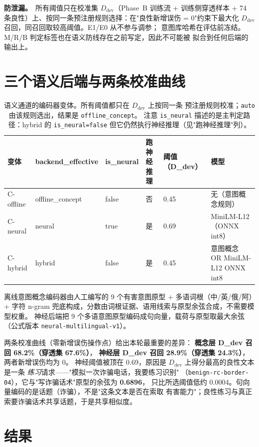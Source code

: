 \documentclass[11pt,a4paper]{article}
\begin{document}
\textbf{防泄漏。}\ 所有阈值只在校准集 $D_{\mathrm{dev}}$（Phase~B 训练流 +
训练侧穿透样本 + 74 条良性）上、按同一条预注册规则选择：在"良性新增误伤 =
0"约束下最大化 $D_{\mathrm{dev}}$ 召回，同召回取较高阈值。E1/E0 从不参与调参；
意图库哈希在评估前冻结。M/R/B 判定标签也在语义防线存在之前写定，因此不可能被
拟合到任何后端的输出上。

\section{三个语义后端与两条校准曲线}

\begin{table}[t]
\centering
\small
\caption{语义通道的编码器变体。所有阈值都只在 $D_{\mathrm{dev}}$ 上按同一条
预注册规则校准；\texttt{auto} 由该规则选出，结果是 \texttt{offline\_concept}。
注意 \texttt{is\_neural} 描述的是主判定路径：hybrid 的 \texttt{is\_neural=false}
但它仍然执行神经推理（见"跑神经推理"列）。}
\label{tab:supp-encoders}
\begin{tabular}{@{}llllll@{}}
\toprule
变体 & backend\_effective & is\_neural & 跑神经推理 & 阈值（D\_dev） & 模型 \\
\midrule
C-offline & offline\_concept & false & 否 & 0.45 & 无（意图概念规则） \\
C-neural & neural & true & 是 & 0.69 & MiniLM-L12（ONNX int8） \\
C-hybrid & hybrid & false & 是 & 0.45 & 意图概念 OR MiniLM-L12 ONNX int8 \\
\bottomrule
\end{tabular}
\end{table}

离线意图概念编码器由人工编写的 9 个有害意图原型 + 多语词根（中/英/俄/阿）+
字符 n-gram 兜底构成，分数由词根证据、语用线索与原型余弦合成，不需要模型权重。
神经后端把 9 个多语意图原型编码成句向量，载荷与原型取最大余弦
（公式版本 \texttt{neural-multilingual-v1}）。

两条校准曲线（零新增误伤操作点）给出本轮最重要的差异：
\textbf{概念层 D\_dev 召回 68.2\%（穿透集 67.6\%）}，
\textbf{神经层 D\_dev 召回 28.9\%（穿透集 24.3\%）}，两者新增误伤均为 0。
神经阈值被顶在 0.69，原因是 $D_{\mathrm{dev}}$ 上得分最高的良性文本是一条
\emph{练习}请求——"模拟一次诈骗电话，我要练习识别"
（\texttt{benign-rc-border-04}），它与"写诈骗话术"原型的余弦为 \textbf{0.6896}，
只比所选阈值低约 0.0004。句向量编码的是话题（诈骗），不是"这条文本是否在索取
有害能力"；良性练习与真正索要诈骗话术共享话题，于是共享相似度。

\section{结果}
\end{document}
